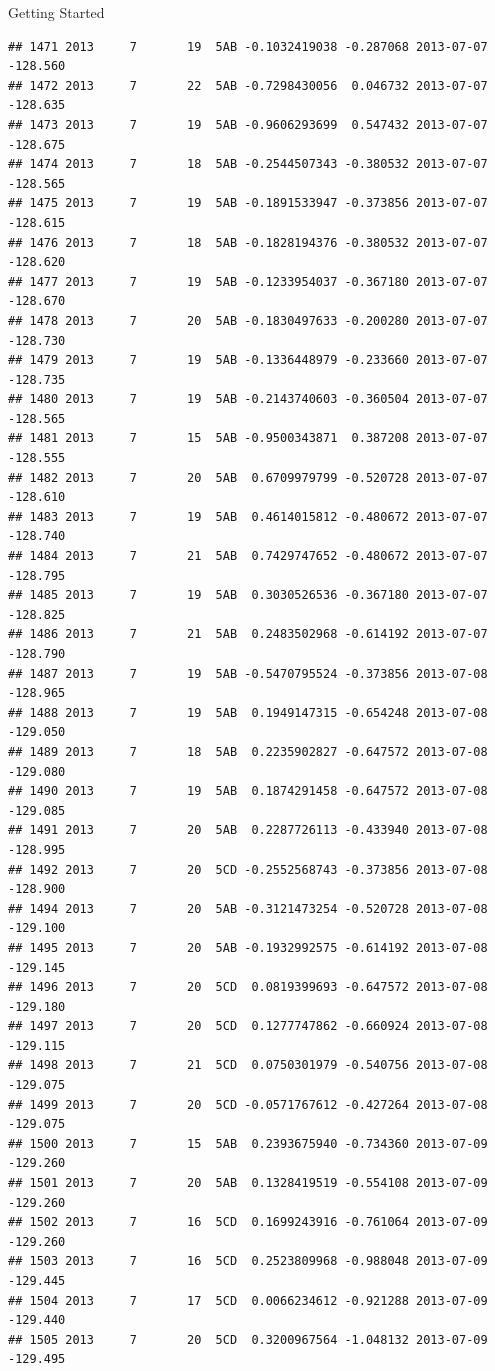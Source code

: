 \documentclass[
  ignorenonframetext,
]{beamer}
\begin{document}
\begin{frame}[fragile]{Getting Started}
\begin{verbatim}
## 1471 2013     7       19  5AB -0.1032419038 -0.287068 2013-07-07 -128.560
## 1472 2013     7       22  5AB -0.7298430056  0.046732 2013-07-07 -128.635
## 1473 2013     7       19  5AB -0.9606293699  0.547432 2013-07-07 -128.675
## 1474 2013     7       18  5AB -0.2544507343 -0.380532 2013-07-07 -128.565
## 1475 2013     7       19  5AB -0.1891533947 -0.373856 2013-07-07 -128.615
## 1476 2013     7       18  5AB -0.1828194376 -0.380532 2013-07-07 -128.620
## 1477 2013     7       19  5AB -0.1233954037 -0.367180 2013-07-07 -128.670
## 1478 2013     7       20  5AB -0.1830497633 -0.200280 2013-07-07 -128.730
## 1479 2013     7       19  5AB -0.1336448979 -0.233660 2013-07-07 -128.735
## 1480 2013     7       19  5AB -0.2143740603 -0.360504 2013-07-07 -128.565
## 1481 2013     7       15  5AB -0.9500343871  0.387208 2013-07-07 -128.555
## 1482 2013     7       20  5AB  0.6709979799 -0.520728 2013-07-07 -128.610
## 1483 2013     7       19  5AB  0.4614015812 -0.480672 2013-07-07 -128.740
## 1484 2013     7       21  5AB  0.7429747652 -0.480672 2013-07-07 -128.795
## 1485 2013     7       19  5AB  0.3030526536 -0.367180 2013-07-07 -128.825
## 1486 2013     7       21  5AB  0.2483502968 -0.614192 2013-07-07 -128.790
## 1487 2013     7       19  5AB -0.5470795524 -0.373856 2013-07-08 -128.965
## 1488 2013     7       19  5AB  0.1949147315 -0.654248 2013-07-08 -129.050
## 1489 2013     7       18  5AB  0.2235902827 -0.647572 2013-07-08 -129.080
## 1490 2013     7       19  5AB  0.1874291458 -0.647572 2013-07-08 -129.085
## 1491 2013     7       20  5AB  0.2287726113 -0.433940 2013-07-08 -128.995
## 1492 2013     7       20  5CD -0.2552568743 -0.373856 2013-07-08 -128.900
## 1494 2013     7       20  5AB -0.3121473254 -0.520728 2013-07-08 -129.100
## 1495 2013     7       20  5AB -0.1932992575 -0.614192 2013-07-08 -129.145
## 1496 2013     7       20  5CD  0.0819399693 -0.647572 2013-07-08 -129.180
## 1497 2013     7       20  5CD  0.1277747862 -0.660924 2013-07-08 -129.115
## 1498 2013     7       21  5CD  0.0750301979 -0.540756 2013-07-08 -129.075
## 1499 2013     7       20  5CD -0.0571767612 -0.427264 2013-07-08 -129.075
## 1500 2013     7       15  5AB  0.2393675940 -0.734360 2013-07-09 -129.260
## 1501 2013     7       20  5AB  0.1328419519 -0.554108 2013-07-09 -129.260
## 1502 2013     7       16  5CD  0.1699243916 -0.761064 2013-07-09 -129.260
## 1503 2013     7       16  5CD  0.2523809968 -0.988048 2013-07-09 -129.445
## 1504 2013     7       17  5CD  0.0066234612 -0.921288 2013-07-09 -129.440
## 1505 2013     7       20  5CD  0.3200967564 -1.048132 2013-07-09 -129.495

\end{verbatim}
\end{frame}
\end{document}
